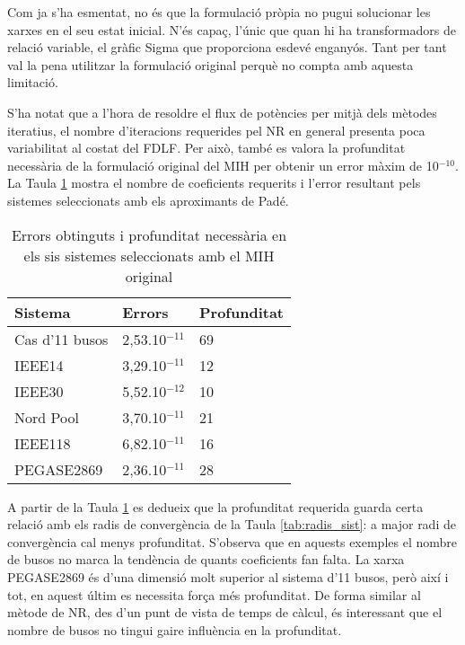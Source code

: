 Com ja s'ha esmentat, no és que la formulació pròpia no pugui solucionar les xarxes en el seu estat inicial. N'és capaç, l'únic que quan hi ha transformadors de relació variable, el gràfic Sigma que proporciona esdevé enganyós. Tant per tant val la pena utilitzar la formulació original perquè no compta amb aquesta limitació.

S'ha notat que a l'hora de resoldre el flux de potències per mitjà dels mètodes iteratius, el nombre d'iteracions requerides pel NR en general presenta poca variabilitat al costat del FDLF. Per això, també es valora la profunditat necessària de la formulació original del MIH per obtenir un error màxim de 10$^{-10}$. La Taula \ref{tab:coef_form_orig} mostra el nombre de coeficients requerits i l'error resultant pels sistemes seleccionats amb els aproximants de Padé.  

\begin{table}[!htb]
  \begin{center}
  \begin{tabular}{lll}
  \hline
  Sistema & Errors & Profunditat\\
  \hline
  \hline
  Cas d'11 busos &2,53.10$^{-11}$ & 69\\
  IEEE14 & 3,29.10$^{-11}$& 12\\
  IEEE30 & 5,52.10$^{-12}$ & 10\\
  Nord Pool & 3,70.10$^{-11}$& 21\\
  IEEE118 & 6,82.10$^{-11}$ & 16\\
  PEGASE2869 &2,36.10$^{-11}$ & 28\\ 
  \hline 
  \end{tabular}
  \caption{Errors obtinguts i profunditat necessària en els sis sistemes seleccionats amb el MIH original}
  \label{tab:coef_form_orig}
  \end{center}
\end{table}

A partir de la Taula \ref{tab:coef_form_orig} es dedueix que la profunditat requerida guarda certa relació amb els radis de convergència de la Taula \ref{tab:radis_sist}: a major radi de convergència cal menys profunditat. S'observa que en aquests exemples el nombre de busos no marca la tendència de quants coeficients fan falta. La xarxa PEGASE2869 és d'una dimensió molt superior al sistema d'11 busos, però així i tot, en aquest últim es necessita força més profunditat. De forma similar al mètode de NR, des d'un punt de vista de temps de càlcul, és interessant que el nombre de busos no tingui gaire influència en la profunditat.

